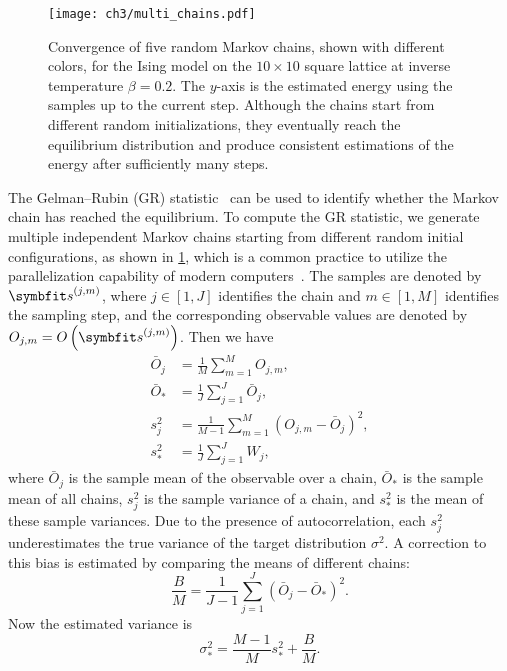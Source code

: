 \begin{figure}[htb]
\centering
\texttt{[image: ch3/multi\_chains.pdf]}
\caption[Convergence of multiple Markov chains]{
Convergence of five random Markov chains, shown with different colors, for the Ising model on the $10 \times 10$ square lattice at inverse temperature $\beta = 0.2$.
The $y$-axis is the estimated energy using the samples up to the current step.
Although the chains start from different random initializations, they eventually reach the equilibrium distribution and produce consistent estimations of the energy after sufficiently many steps.
}
\label{fig:multi-chains}
\end{figure}

The Gelman--Rubin (GR) statistic~\cite{gelman1992inference, vats2021revisiting} can be used to identify whether the Markov chain has reached the equilibrium. To compute the GR statistic, we generate multiple independent Markov chains starting from different random initial configurations, as shown in \cref{fig:multi-chains}, which is a common practice to utilize the parallelization capability of modern computers~\cite{lee2010utility}. The samples are denoted by $\vs^{(j, m)}$, where $j \in [1, J]$ identifies the chain and $m \in [1, M]$ identifies the sampling step, and the corresponding observable values are denoted by $O_{j, m} = O\left( \vs^{(j, m)} \right)$. Then we have
\begin{align}
\bar{O}_j &= \frac{1}{M} \sum_{m = 1}^M O_{j, m}, \\
\bar{O}_* &= \frac{1}{J} \sum_{j = 1}^J \bar{O}_j, \\
s^2_j &= \frac{1}{M - 1} \sum_{m = 1}^M (O_{j, m} - \bar{O}_j)^2, \\
s^2_* &= \frac{1}{J} \sum_{j = 1}^J W_j,
\end{align}
where $\bar{O}_j$ is the sample mean of the observable over a chain, $\bar{O}_*$ is the sample mean of all chains, $s^2_j$ is the sample variance of a chain, and $s^2_*$ is the mean of these sample variances. Due to the presence of autocorrelation, each $s^2_j$ underestimates the true variance of the target distribution $\sigma^2$. A correction to this bias is estimated by comparing the means of different chains:
\begin{equation}
\frac{B}{M} = \frac{1}{J - 1} \sum_{j = 1}^J (\bar{O}_j - \bar{O}_*)^2.
\end{equation}
Now the estimated variance is
\begin{equation}
\sigma^2_* = \frac{M - 1}{M} s^2_* + \frac{B}{M}.
\end{equation}
